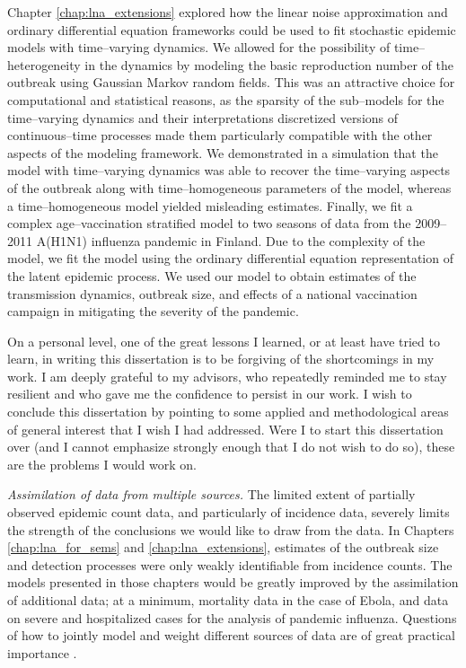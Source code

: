 Chapter \ref{chap:lna_extensions} explored how the linear noise approximation and ordinary differential equation frameworks could be used to fit stochastic epidemic models with time--varying dynamics. We allowed for the possibility of time--heterogeneity in the dynamics by modeling the basic reproduction number of the outbreak using Gaussian Markov random fields. This was an attractive choice for computational and statistical reasons, as the sparsity of the sub--models for the time--varying dynamics and their interpretations discretized versions of continuous--time processes made them particularly compatible with the other aspects of the modeling framework. We demonstrated in a simulation that the model with time--varying dynamics was able to recover the time--varying aspects of the outbreak along with time--homogeneous parameters of the model, whereas a time--homogeneous model yielded misleading estimates. Finally, we fit a complex age--vaccination stratified model to two seasons of data from the 2009--2011 A(H1N1) influenza pandemic in Finland. Due to the complexity of the model, we fit the model using the ordinary differential equation representation of the latent epidemic process. We used our model to obtain estimates of the transmission dynamics, outbreak size, and effects of a national vaccination campaign in mitigating the severity of the pandemic. 

On a personal level, one of the great lessons I learned, or at least have tried to learn, in writing this dissertation is to be forgiving of the shortcomings in my work. I am deeply grateful to my advisors, who repeatedly reminded me to stay resilient and who gave me the confidence to persist in our work. I wish to conclude this dissertation by pointing to some applied and methodological areas of general interest that I wish I had addressed. Were I to start this dissertation over (and I cannot emphasize strongly enough that I do not wish to do so), these are the problems I would work on. 

\textit{Assimilation of data from multiple sources.}
The limited extent of partially observed epidemic count data, and particularly of incidence data, severely limits the strength of the conclusions we would like to draw from the data. In Chapters \ref{chap:lna_for_sems} and \ref{chap:lna_extensions}, estimates of the outbreak size and detection processes were only weakly identifiable from incidence counts. The models presented in those chapters would be greatly improved by the assimilation of additional data; at a minimum, mortality data in the case of Ebola, and data on severe and hospitalized cases for the analysis of pandemic influenza. Questions of how to jointly model and weight different sources of data are of great practical importance \cite{deangelis2015four}. 


